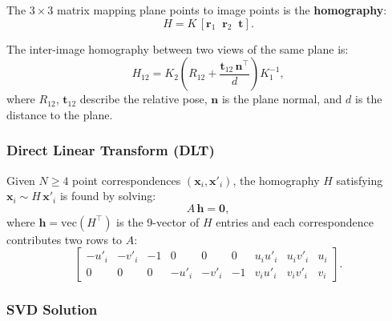 \documentclass[12pt, a4paper]{article}
\begin{document}
The $3\times3$ matrix mapping plane points to image points is the \textbf{homography}:
\begin{equation}
  H = K\,[\mathbf{r}_1\;\;\mathbf{r}_2\;\;\mathbf{t}].
  \label{eq:H_def}
\end{equation}

The inter-image homography between two views of the same plane is:
\begin{equation}
  H_{12} = K_2\left(R_{12} + \frac{\mathbf{t}_{12}\,\mathbf{n}^\top}{d}\right)K_1^{-1},
  \label{eq:H_inter}
\end{equation}
where $R_{12}$, $\mathbf{t}_{12}$ describe the relative pose, $\mathbf{n}$ is the plane normal, and $d$ is the distance to the plane.


\subsubsection{Direct Linear Transform (DLT)}

Given $N \geq 4$ point correspondences $(\mathbf{x}_i, \mathbf{x}'_i)$, the homography $H$ satisfying $\mathbf{x}_i \sim H\,\mathbf{x}'_i$ is found by solving:
\begin{equation}
  A\,\mathbf{h} = \mathbf{0},
\end{equation}
where $\mathbf{h} = \mathrm{vec}(H^\top)$ is the 9-vector of $H$ entries and each correspondence contributes two rows to $A$:
\[
  \begin{bmatrix}
    -u'_i & -v'_i & -1 & 0 & 0 & 0 & u_i u'_i & u_i v'_i & u_i\\
    0 & 0 & 0 & -u'_i & -v'_i & -1 & v_i u'_i & v_i v'_i & v_i
  \end{bmatrix}.
\]

\subsubsection{SVD Solution}
\end{document}
